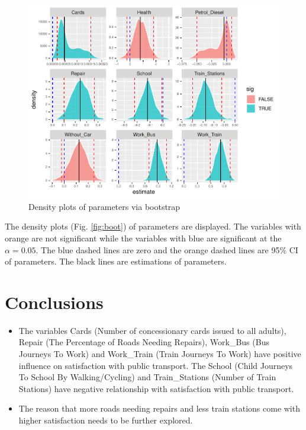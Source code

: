 \documentclass[
]{article}
\begin{document}
\begin{figure}[H]

{\centering \includegraphics[width=0.8\linewidth]{RMD-Group-28_files/figure-latex/unnamed-chunk-11-1} 

}

\caption{Density plots of parameters via bootstrap\label{fig:boot}}\label{fig:unnamed-chunk-11}
\end{figure}

The density plots (Fig. \ref{fig:boot}) of parameters are displayed. The
variables with orange are not significant while the variables with blue
are significant at the \(\alpha=0.05\). The blue dashed lines are zero
and the orange dashed lines are 95\% CI of parameters. The black lines
are estimations of parameters.

\hypertarget{sec:Conc}{%
\section{Conclusions}\label{sec:Conc}}

\begin{itemize}
\item
  The variables Cards (Number of concessionary cards issued to all
  adults), Repair (The Percentage of Roads Needing Repairs), Work\_Bus
  (Bus Journeys To Work) and Work\_Train (Train Journeys To Work) have
  positive influence on satisfaction with public transport. The School
  (Child Journeys To School By Walking/Cycling) and Train\_Stations
  (Number of Train Stations) have negative relationship with
  satisfaction with public transport.
\item
  The reason that more roads needing repairs and less train stations
  come with higher satisfaction needs to be further explored.
\end{itemize}
\end{document}
